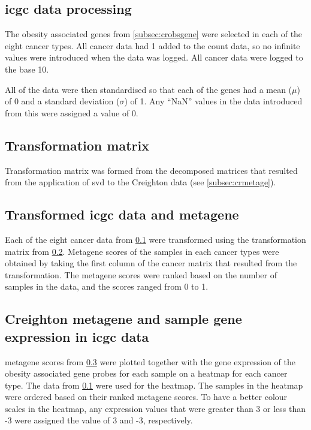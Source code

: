 \subsection{\gls{icgc} data processing}
\label{subsec:datprocicgc}

The obesity associated genes from \cref{subsec:crobsgene} were selected in each of the eight cancer types.
All cancer data had 1 added to the count data, so no infinite values were introduced when the data was logged.
All cancer data were logged to the base 10.

All of the data were then standardised so that each of the genes had a mean ($\mu$) of 0 and a standard deviation ($\sigma$) of 1.
Any ``NaN'' values in the data introduced from this were assigned a value of 0.

\subsection{Transformation matrix}
\label{subsec:transmatcr}

Transformation matrix was formed from the decomposed matrices that resulted from the application of \gls{svd} to the Creighton data (see \cref{subsec:crmetage}).

\subsection{Transformed \gls{icgc} data and metagene}
\label{subsec:icgctranscr}

Each of the eight cancer data from \cref{subsec:datprocicgc} were transformed using the transformation matrix from \cref{subsec:transmatcr}.
Metagene scores of the samples in each cancer types were obtained by taking the first column of the cancer matrix that resulted from the transformation.
The \gls{metagene} scores were ranked based on the number of samples in the data, and the scores ranged from 0 to 1.

\subsection{Creighton metagene and sample gene expression in \gls{icgc} data}
\label{subsec:crmetaicgcge}

\Gls{metagene} scores from \cref{subsec:icgctranscr} were plotted together with the gene expression of the obesity associated gene probes for each sample on a heatmap for each cancer type.
The data from \cref{subsec:datprocicgc} were used for the heatmap.
The samples in the heatmap were ordered based on their ranked \gls{metagene} scores.
To have a better colour scales in the heatmap, any expression values that were greater than 3 or less than -3 were assigned the value of 3 and -3, respectively.

